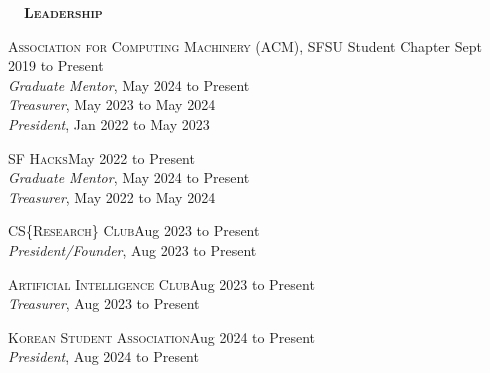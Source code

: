 \documentclass[hidelinks, 10.5pt]{article}
\def\contentwidth{0.9\linewidth}    %
\def\contentspacing{2.5mm}          %
\def\sectiontocontentspacing{4mm}   %
\renewcommand{\section}[1]{
    {\fontsize{14}{14}\selectfont \textsc{\textbf{\ \ #1\ \ }}}\hrulefill
}
\begin{document}
{\section{Leadership}

\vspace{\sectiontocontentspacing}

\begin{minipage}[ct]{\contentwidth}
    \textsc{Association for Computing Machinery} (ACM), SFSU Student Chapter\hfill
    Sept 2019 to Present\\
    \emph{Graduate Mentor}, May 2024 to Present\\
    \emph{Treasurer}, May 2023 to May 2024\\
    \emph{President}, Jan 2022 to May 2023
\end{minipage}

\vspace{\contentspacing}

\begin{minipage}[ct]{\contentwidth}
    \textsc{SF Hacks}\hfill May 2022 to Present\\
    \emph{Graduate Mentor}, May 2024 to Present\\
    \emph{Treasurer}, May 2022 to May 2024
\end{minipage}

\vspace{\contentspacing}

\begin{minipage}[ct]{\contentwidth}
    \textsc{CS}\{\textsc{Research}\}\textsc{ Club}\hfill Aug 2023 to Present\\
    \emph{President/Founder}, Aug 2023 to Present
\end{minipage}

\vspace{\contentspacing}

\begin{minipage}[ct]{\contentwidth}
    \textsc{Artificial Intelligence Club}\hfill Aug 2023 to Present\\
    \emph{Treasurer}, Aug 2023 to Present
\end{minipage}

\vspace{\contentspacing}

\begin{minipage}[ct]{\contentwidth}
    \textsc{Korean Student Association}\hfill Aug 2024 to Present\\
    \emph{President}, Aug 2024 to Present
\end{minipage}

}
\end{document}
